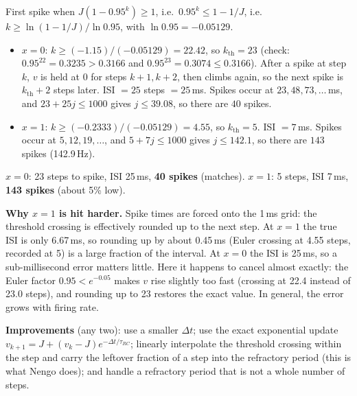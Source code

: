 \documentclass[10pt,letterpaper]{article}
\newcommand{\trc}{\tau_{RC}}
\newcommand{\ans}[1]{\par\vspace{3pt}{\bfseries #1}\quad}
\begin{document}
\ans{2d.}
First spike when $J(1 - 0.95^k) \ge 1$, i.e.\ $0.95^k \le 1 - 1/J$, i.e.\ $k \ge \ln(1 - 1/J)/\ln 0.95$, with $\ln 0.95 = -0.05129$.
\begin{itemize}[leftmargin=1.5em,itemsep=1pt]
\item $x = 0$: $k \ge (-1.15)/(-0.05129) = 22.42$, so $k_{\mathrm{th}} = 23$ (check: $0.95^{22} = 0.3235 > 0.3166$ and $0.95^{23} = 0.3074 \le 0.3166$).
After a spike at step $k$, $v$ is held at 0 for steps $k+1, k+2$, then climbs again, so the next spike is $k_{\mathrm{th}} + 2$ steps later. ISI $= 25$ steps $= 25$\,ms. Spikes occur at $23, 48, 73, \ldots$\,ms, and $23 + 25j \le 1000$ gives $j \le 39.08$, so there are $40$ spikes.
\item $x = 1$: $k \ge (-0.2333)/(-0.05129) = 4.55$, so $k_{\mathrm{th}} = 5$. ISI $= 7$\,ms. Spikes occur at $5, 12, 19, \ldots$, and $5 + 7j \le 1000$ gives $j \le 142.1$, so there are $143$ spikes (142.9\,Hz).
\end{itemize}
\begin{result}
$x = 0$: 23 steps to spike, ISI 25\,ms, \textbf{40 spikes} (matches). \quad $x = 1$: 5 steps, ISI 7\,ms, \textbf{143 spikes} (about 5\% low).
\end{result}
\textbf{Why $x = 1$ is hit harder.} Spike times are forced onto the 1\,ms grid: the threshold crossing is effectively rounded up to the next step. At $x = 1$ the true ISI is only 6.67\,ms, so rounding up by about 0.45\,ms (Euler crossing at 4.55 steps, recorded at 5) is a large fraction of the interval. At $x = 0$ the ISI is 25\,ms, so a sub-millisecond error matters little. Here it happens to cancel almost exactly: the Euler factor $0.95 < e^{-0.05}$ makes $v$ rise slightly too fast (crossing at 22.4 instead of 23.0 steps), and rounding up to 23 restores the exact value. In general, the error grows with firing rate.

\textbf{Improvements} (any two): use a smaller $\Delta t$; use the exact exponential update $v_{k+1} = J + (v_k - J)e^{-\Delta t/\trc}$; linearly interpolate the threshold crossing within the step and carry the leftover fraction of a step into the refractory period (this is what Nengo does); and handle a refractory period that is not a whole number of steps.
\end{document}
